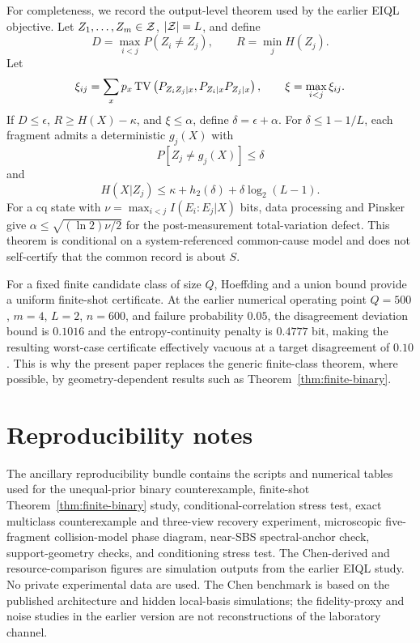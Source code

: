 For completeness, we record the output-level theorem used by the earlier EIQL objective.  Let $Z_1,\ldots,Z_m\in\mathcal Z$, $|\mathcal Z|=L$, and define
\begin{equation}
D=\max_{i<j}P(Z_i\neq Z_j),\qquad
R=\min_jH(Z_j).
\end{equation}
Let
\begin{equation}
\xi_{ij}=\sum_xp_x\operatorname{TV}\left(P_{Z_iZ_j|x},P_{Z_i|x}P_{Z_j|x}\right),
\qquad
\xi=\max_{i<j}\xi_{ij}.
\end{equation}
If $D\le\epsilon$, $R\ge H(X)-\kappa$, and $\xi\le\alpha$, define $\delta=\epsilon+\alpha$.  For $\delta\le1-1/L$, each fragment admits a deterministic $g_j(X)$ with
\begin{equation}
P[Z_j\neq g_j(X)]\le\delta
\end{equation}
and
\begin{equation}
H(X|Z_j)\le\kappa+h_2(\delta)+\delta\log_2(L-1).
\end{equation}
For a cq state with $\nu=\max_{i<j}I(E_i:E_j|X)$ bits, data processing and Pinsker give $\alpha\le\sqrt{(\ln2)\nu/2}$ for the post-measurement total-variation defect.  This theorem is conditional on a system-referenced common-cause model and does not self-certify that the common record is about $S$.

For a fixed finite candidate class of size $Q$, Hoeffding and a union bound provide a uniform finite-shot certificate.  At the earlier numerical operating point $Q=500$, $m=4$, $L=2$, $n=600$, and failure probability $0.05$, the disagreement deviation bound is $0.1016$ and the entropy-continuity penalty is $0.4777$ bit, making the resulting worst-case certificate effectively vacuous at a target disagreement of $0.10$.  This is why the present paper replaces the generic finite-class theorem, where possible, by geometry-dependent results such as Theorem~\ref{thm:finite-binary}.

\section{Reproducibility notes}

The ancillary reproducibility bundle contains the scripts and numerical tables used for the unequal-prior binary counterexample, finite-shot Theorem~\ref{thm:finite-binary} study, conditional-correlation stress test, exact multiclass counterexample and three-view recovery experiment, microscopic five-fragment collision-model phase diagram, near-SBS spectral-anchor check, support-geometry checks, and conditioning stress test.  The Chen-derived and resource-comparison figures are simulation outputs from the earlier EIQL study.  No private experimental data are used.  The Chen benchmark is based on the published architecture and hidden local-basis simulations; the fidelity-proxy and noise studies in the earlier version are not reconstructions of the laboratory channel.


